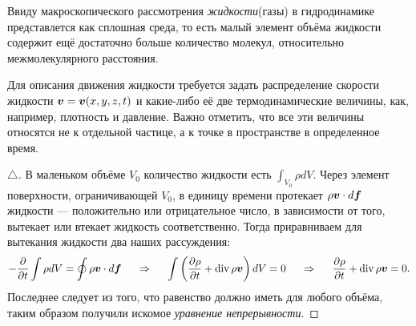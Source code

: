 \begin{to_def}
	Ввиду макроскопического рассмотрения \textit{жидкости}(газы) в гидродинамике представлется как сплошная среда, то есть малый элемент объёма жидкости содержит ещё достаточно больше количество молекул, относительно межмолекулярного расстояния.
\end{to_def}

Для описания движения жидкости требуется задать распределение скорости жидкости $\mbox{\boldmath $v$} = \mbox{\boldmath $v$}(x,y,z,t)$ и какие-либо её две термодинамические величины, как, например, плотность и давление. Важно отметить, что все эти величины относятся не к отдельной частице, а к точке в пространстве в определенное время.

\begin{to_thr}
\phantom{239}

\begin{proof}[$\triangle$]
	В маленьком объёме $V_{0}$ количество жидкости есть $\int_{V_0} \rho d V$.
	Через элемент поверхности, ограничивающей $V_0$, в единицу времени протекает $\rho \mbox{\boldmath $v$} \cdot d \mbox{\boldmath $f$}$ жидкости --- положительно или отрицательное число, в зависимости от того, вытекает или втекает жидкость соответственно.
	Тогда приравниваем для вытекания жидкости два наших рассуждения:
	\begin{equation*}
		- \frac{\partial}{\partial t} \int \rho d V =  \oint \rho \mbox{\boldmath $v$} \cdot d \mbox{\boldmath $f$}
		\hspace*{0.5 cm} 
		\Rightarrow 
		\hspace*{0.5 cm}
		\int \left(\frac{\partial \rho}{\partial t} + \mathop{\mathrm{div}}\nolimits \rho \mbox{\boldmath $v$}\right)d V = 0
		\hspace*{0.5 cm}
		\Rightarrow
		\hspace*{0.5 cm}
		\frac{\partial \rho}{\partial t} + \mathop{\mathrm{div}}\nolimits \rho \mbox{\boldmath $v$} = 0.
	\end{equation*}
	Последнее следует из того, что равенство должно иметь для любого объёма, таким образом получили искомое \textit{уравнение непрерывности}.
\end{proof}
	
\end{to_thr}

